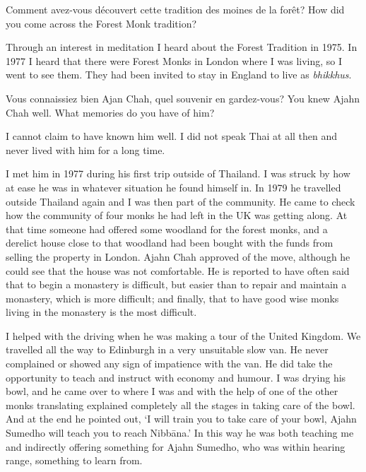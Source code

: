 
\questionBi%
{Comment avez-vous découvert cette tradition des moines de la forêt?}%
{How did you come across the Forest Monk tradition?}

\answer{}
Through an interest in meditation I heard about the Forest Tradition
in 1975. In 1977 I heard that there were Forest Monks in London where I
was living, so I went to see them. They had been invited to stay in
England to live as \emph{bhikkhus}.

\questionBi%
{Vous connaissiez bien Ajan Chah, quel souvenir en gardez-vous?}%
{You knew Ajahn Chah well. What memories do you have of him?}

\answer{}
I cannot claim to have known him well. I did not speak Thai at
all then and never lived with him for a long time.

I met him in 1977 during his first trip outside of Thailand. I was
struck by how at ease he was in whatever situation he found himself in. 
In 1979 he travelled outside Thailand again and I was then part of the
community. He came to check how the community of four monks he had left
in the UK was getting along. At that time someone had offered some
woodland for the forest monks, and a derelict house close to that
woodland had been bought with the funds from selling the property in
London. Ajahn Chah approved of the move, although he could see that the
house was not comfortable. He is reported to have often said that to
begin a monastery is difficult, but easier than to repair and maintain a
monastery, which is more difficult; and finally, that to have good wise
monks living in the monastery is the most difficult. 

I helped with the driving when he was making a tour of the United
Kingdom. We travelled all the way to Edinburgh in a very unsuitable slow
van. He never complained or showed any sign of impatience with the van. 
He did take the opportunity to teach and instruct with economy and
humour. I was drying his bowl, and he came over to where I was and with
the help of one of the other monks translating explained completely all
the stages in taking care of the bowl. And at the end he pointed out, `I
will train you to take care of your bowl, Ajahn Sumedho will teach you
to reach Nibbāna.' In this way he was both teaching me and indirectly
offering something for Ajahn Sumedho, who was within hearing range, 
something to learn from. 

